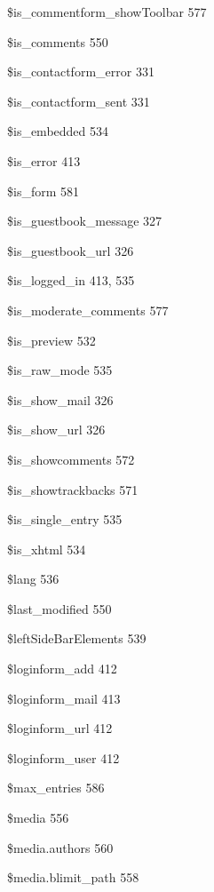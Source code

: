 \documentclass{book}
\renewcommand\subitem{\par}
\begin{document}
\begin{multicols}{2}
\begin{osp-index}
    \subitem \$is\_commentform\_showToolbar\hspace{1mm} 577
    \subitem \$is\_comments\hspace{1mm} 550
    \subitem \$is\_contactform\_error\hspace{1mm} 331
    \subitem \$is\_contactform\_sent\hspace{1mm} 331
    \subitem \$is\_embedded\hspace{1mm} 534
    \subitem \$is\_error\hspace{1mm} 413
    \subitem \$is\_form\hspace{1mm} 581
    \subitem \$is\_guestbook\_message\hspace{1mm} 327
    \subitem \$is\_guestbook\_url\hspace{1mm} 326
    \subitem \$is\_logged\_in\hspace{1mm} 413, 535
    \subitem \$is\_moderate\_comments\hspace{1mm} 577
    \subitem \$is\_preview\hspace{1mm} 532
    \subitem \$is\_raw\_mode\hspace{1mm} 535
    \subitem \$is\_show\_mail\hspace{1mm} 326
    \subitem \$is\_show\_url\hspace{1mm} 326
    \subitem \$is\_showcomments\hspace{1mm} 572
    \subitem \$is\_showtrackbacks\hspace{1mm} 571
    \subitem \$is\_single\_entry\hspace{1mm} 535
    \subitem \$is\_xhtml\hspace{1mm} 534
    \subitem \$lang\hspace{1mm} 536
    \subitem \$last\_modified\hspace{1mm} 550
    \subitem \$leftSideBarElements\hspace{1mm} 539
    \subitem \$loginform\_add\hspace{1mm} 412
    \subitem \$loginform\_mail\hspace{1mm} 413
    \subitem \$loginform\_url\hspace{1mm} 412
    \subitem \$loginform\_user\hspace{1mm} 412
    \subitem \$max\_entries\hspace{1mm} 586
    \subitem \$media\hspace{1mm} 556
    \subitem \$media.authors\hspace{1mm} 560
    \subitem \$media.blimit\_path\hspace{1mm} 558

\end{osp-index}
\end{multicols}
\end{document}
